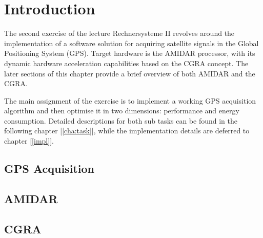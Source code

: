 \chapter{Introduction}
\label{cha:intro}
	The second exercise of the lecture Rechnersysteme II revolves around the implementation of a software solution for acquiring satellite signals in the Global Positioning System (GPS). Target hardware is the AMIDAR processor, with its dynamic hardware acceleration capabilities based on the CGRA concept. The later sections of this chapter provide a brief overview of both AMIDAR and the CGRA.

	The main assignment of the exercise is to implement a working GPS acquisition algorithm and then optimise it in two dimensions: performance and energy consumption. Detailed descriptions for both sub tasks can be found in the following chapter [\ref{cha:task}], while the implementation details are deferred to chapter [\ref{impl}].

	\section{GPS Acquisition} %
	\label{sec:intro_acq}


	\section{AMIDAR} %
	\label{sec:intro_amidar}


	\section{CGRA} %
	\label{sec:intro_cgra}


